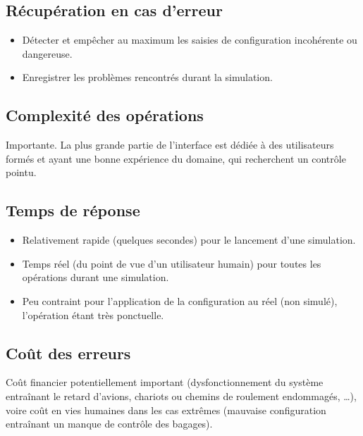 \subsection{Récupération en cas d'erreur}
\begin{itemize}
	\item Détecter et empêcher au maximum les saisies de configuration incohérente ou dangereuse.
	\item Enregistrer les problèmes rencontrés durant la simulation.
\end{itemize}

\subsection{Complexité des opérations}
Importante. La plus grande partie de l'interface est dédiée à des utilisateurs formés et ayant une bonne expérience du domaine, qui recherchent un contrôle pointu.

\subsection{Temps de réponse}
\begin{itemize}
	\item Relativement rapide (quelques secondes) pour le lancement d'une simulation.
	\item Temps réel (du point de vue d'un utilisateur humain) pour toutes les opérations durant une simulation.
	\item Peu contraint pour l'application de la configuration au  réel (non simulé), l'opération étant très ponctuelle.
\end{itemize}

\subsection{Coût des erreurs}
Coût financier potentiellement important (dysfonctionnement du système entraînant le retard d'avions, chariots ou chemins de roulement endommagés, \ldots), voire coût en vies humaines dans les cas extrêmes (mauvaise configuration entraînant un manque de contrôle des bagages).

